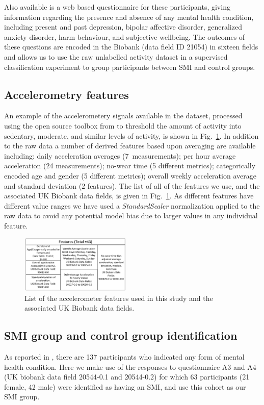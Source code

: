 \documentclass[letterpaper, 10pt, conference]{ieeeconf} %
\newcommand{\fig}[1]{Fig.~\ref{#1}}
\begin{document}
  Also available is a web based questionnaire for these participants, giving information regarding the presence and absence of any mental health condition, including present and past depression, bipolar affective disorder, generalized anxiety disorder, harm behaviour, and subjective wellbeing. The outcomes of these questions are encoded in the Biobank (data field ID 21054) in sixteen fields and allows us to use the raw unlabelled activity dataset in a supervised classification experiment to group participants between SMI and control groups.

  \subsection{Accelerometry features}
  An example of the accelerometery signals available in the dataset, processed using the open source toolbox from \cite{Doherty2017} to threshold the amount of activity into sedentary, moderate, and similar levels of activity, is shown in \fig{feat1}. In addition to the raw data a number of derived features based upon averaging are available including: daily acceleration averages (7~measurements); per hour average acceleration (24 measurements); no-wear time (5 different metrics); categorically encoded age and gender (5 different metrics); overall weekly acceleration average and standard deviation (2 features). The list of all of the features we use, and the associated UK Biobank data fields, is given in \fig{feat1}. As different features have different value ranges we have used a \emph{StandardScaler} normalization applied to the raw data to avoid any potential model bias due to larger values in any individual feature.
  \begin{figure}
    \centering
    \includegraphics[width=0.47\textwidth]{images/biobank_acc_features-2.png}
    \caption{List of the accelerometer features used in this study and the associated UK Biobank data fields.} 
    \label{feat1}
  \end{figure}

  \subsection{SMI group and control group identification}
  As reported in \cite{Davis2018mhq}, there are 137 participants who indicated any form of mental health condition. Here we make use of the responses to questionnaire A3 and A4 (UK biobank data field 20544-0.1 and 20544-0.2) for which 63 participants (21 female, 42 male) were identified as having an SMI, and use this cohort as our SMI group. 
 
\end{document}
